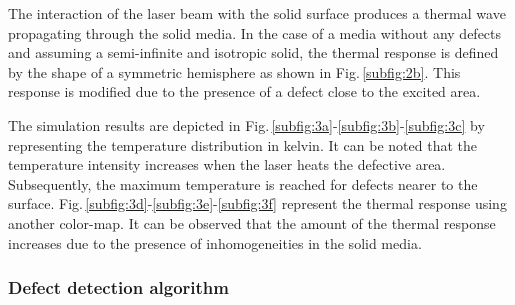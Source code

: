 

The interaction of the laser beam with the solid surface produces a thermal wave propagating through the solid media. In the case of a media without any defects and assuming a semi-infinite and isotropic solid, the thermal response is defined by the shape of a symmetric hemisphere\cite{Li2011} as shown in Fig.\,\ref{subfig:2b}. This response is modified due to the presence of a defect close to the excited area.

The simulation results are depicted in Fig.\,\ref{subfig:3a}-\ref{subfig:3b}-\ref{subfig:3c} by representing the temperature distribution in kelvin. It can be noted that the temperature intensity increases when the laser heats the defective area. Subsequently, the maximum temperature is reached for defects nearer to the surface. Fig.\,\ref{subfig:3d}-\ref{subfig:3e}-\ref{subfig:3f} represent the thermal response using another color-map. It can be observed that the amount of the thermal response increases due to the presence of inhomogeneities in the solid media.
	
\subsubsection{Defect detection algorithm}\label{subsec:312}
\graphicspath{{./Figure/Figure4/}}

%

